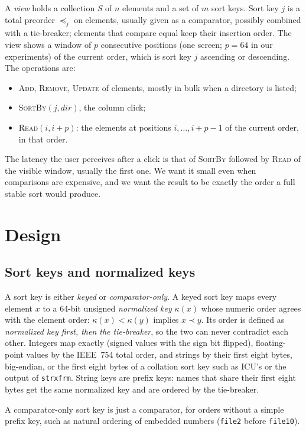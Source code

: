 \documentclass[11pt]{article}
\theoremstyle{definition}
\begin{document}
A \emph{view} holds a collection $S$ of $n$ elements and a set of $m$ sort
keys. Sort key $j$ is a total preorder $\preceq_j$ on elements, usually given
as a comparator, possibly combined with a tie-breaker; elements that compare
equal keep their insertion order. The view shows a window of $p$ consecutive
positions (one screen; $p=64$ in our experiments) of the current order, which
is sort key $j$ ascending or descending. The operations are:
\begin{itemize}
\item \textsc{Add}, \textsc{Remove}, \textsc{Update} of elements, mostly in
  bulk when a directory is listed;
\item \textsc{SortBy}$(j, \mathit{dir})$, the column click;
\item \textsc{Read}$(i, i+p)$: the elements at positions $i,\dots,i+p-1$ of the
  current order, in that order.
\end{itemize}
The latency the user perceives after a click is that of \textsc{SortBy}
followed by \textsc{Read} of the visible window, usually the first one. We
want it small even when comparisons are expensive, and we want the result to
be exactly the order a full stable sort would produce.

\section{Design}\label{sec:design}

\subsection{Sort keys and normalized keys}

A sort key is either \emph{keyed} or \emph{comparator-only}. A keyed sort key
maps every element $x$ to a 64-bit unsigned \emph{normalized key} $\kappa(x)$
whose numeric order agrees with the element order: $\kappa(x) < \kappa(y)$
implies $x \prec y$. Its order is defined as \emph{normalized key first, then
the tie-breaker}, so the two can never contradict each other. Integers map
exactly (signed values with the sign bit flipped), floating-point values by
the IEEE~754 total order, and strings by their first eight bytes, big-endian,
or the first eight bytes of a collation sort key such as ICU's or the output
of \texttt{strxfrm}. String keys are prefix keys: names that share their first
eight bytes get the same normalized key and are ordered by the tie-breaker.

A comparator-only sort key is just a comparator, for orders without a simple
prefix key, such as natural ordering of embedded numbers (\texttt{file2} before
\texttt{file10}).
\end{document}
